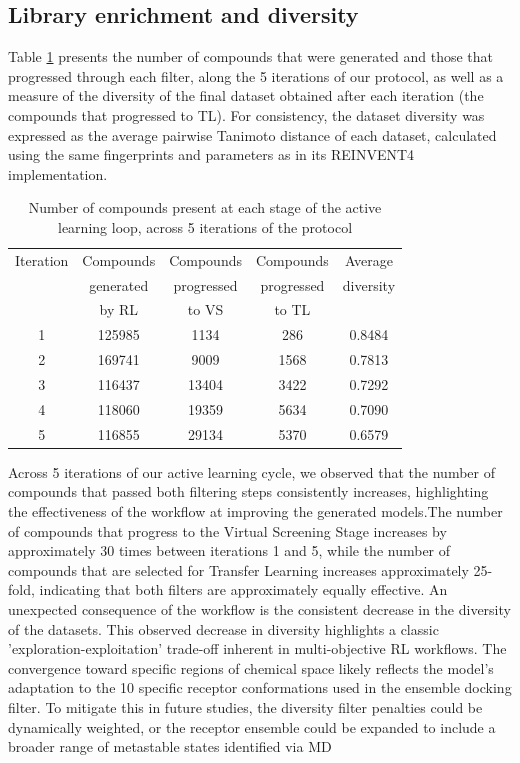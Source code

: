 \documentclass[letterpaper]{article}
\begin{document}
\subsection{Library enrichment and diversity}
Table \ref{tab:library_enrichment} presents the number of compounds that were generated and those that progressed through each filter, along the 5 iterations of our protocol, as well as a measure of the diversity of the final dataset obtained after each iteration (the compounds that progressed to TL). For consistency, the dataset diversity was expressed as the average pairwise Tanimoto distance of each dataset, calculated using the same fingerprints and parameters as in its REINVENT4 implementation.  
\begin{table}[H]
  \caption{Number of compounds present at each stage of the active learning loop, across 5 iterations of the protocol}
  \label{tab:library_enrichment}
  \centering
  \begin{tabular}{ccccc}
    \hline
    Iteration & Compounds & Compounds & Compounds   & Average\\
              & generated & progressed & progressed & diversity\\
              & by RL     & to VS      & to TL\\
    \hline
    1 & 125985 & 1134  & 286  & 0.8484\\
    2 & 169741 & 9009  & 1568 & 0.7813\\
    3 & 116437 & 13404 & 3422 & 0.7292\\
    4 & 118060 & 19359 & 5634 & 0.7090\\
    5 & 116855 & 29134 & 5370 & 0.6579\\
    \hline
  \end{tabular}
\end{table}
Across 5 iterations of our active learning cycle, we observed that the number of compounds that passed both filtering steps consistently increases, highlighting the effectiveness of the workflow at improving the generated models.The number of compounds that progress to the Virtual Screening Stage increases by approximately 30 times between iterations 1 and 5, while the number of compounds that are selected for Transfer Learning increases approximately 25-fold, indicating that both filters are approximately equally effective.
An unexpected consequence of the workflow is the consistent decrease in the diversity of the datasets. This observed decrease in diversity highlights a classic 'exploration-exploitation' trade-off inherent in multi-objective RL workflows. The convergence toward specific regions of chemical space likely reflects the model’s adaptation to the 10 specific receptor conformations used in the ensemble docking filter. To mitigate this in future studies, the diversity filter penalties could be dynamically weighted, or the receptor ensemble could be expanded to include a broader range of metastable states identified via MD 
\end{document}
